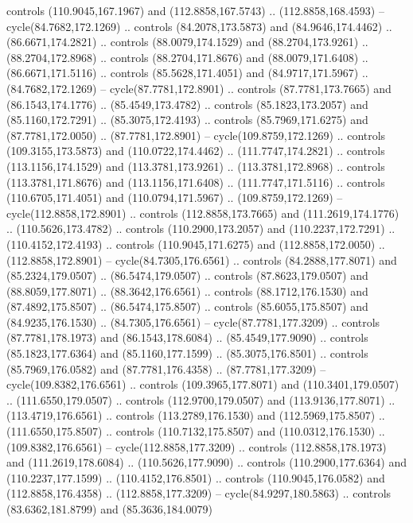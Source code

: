 \begin{scope}[cm={{1.25,0.0,0.0,-1.25,(0.0,442.91375)}}]
    controls (110.9045,167.1967) and (112.8858,167.5743) .. (112.8858,168.4593) --
    cycle(84.7682,172.1269) .. controls (84.2078,173.5873) and (84.9646,174.4462)
    .. (86.6671,174.2821) .. controls (88.0079,174.1529) and (88.2704,173.9261) ..
    (88.2704,172.8968) .. controls (88.2704,171.8676) and (88.0079,171.6408) ..
    (86.6671,171.5116) .. controls (85.5628,171.4051) and (84.9717,171.5967) ..
    (84.7682,172.1269) -- cycle(87.7781,172.8901) .. controls (87.7781,173.7665)
    and (86.1543,174.1776) .. (85.4549,173.4782) .. controls (85.1823,173.2057)
    and (85.1160,172.7291) .. (85.3075,172.4193) .. controls (85.7969,171.6275)
    and (87.7781,172.0050) .. (87.7781,172.8901) -- cycle(109.8759,172.1269) ..
    controls (109.3155,173.5873) and (110.0722,174.4462) .. (111.7747,174.2821) ..
    controls (113.1156,174.1529) and (113.3781,173.9261) .. (113.3781,172.8968) ..
    controls (113.3781,171.8676) and (113.1156,171.6408) .. (111.7747,171.5116) ..
    controls (110.6705,171.4051) and (110.0794,171.5967) .. (109.8759,172.1269) --
    cycle(112.8858,172.8901) .. controls (112.8858,173.7665) and
    (111.2619,174.1776) .. (110.5626,173.4782) .. controls (110.2900,173.2057) and
    (110.2237,172.7291) .. (110.4152,172.4193) .. controls (110.9045,171.6275) and
    (112.8858,172.0050) .. (112.8858,172.8901) -- cycle(84.7305,176.6561) ..
    controls (84.2888,177.8071) and (85.2324,179.0507) .. (86.5474,179.0507) ..
    controls (87.8623,179.0507) and (88.8059,177.8071) .. (88.3642,176.6561) ..
    controls (88.1712,176.1530) and (87.4892,175.8507) .. (86.5474,175.8507) ..
    controls (85.6055,175.8507) and (84.9235,176.1530) .. (84.7305,176.6561) --
    cycle(87.7781,177.3209) .. controls (87.7781,178.1973) and (86.1543,178.6084)
    .. (85.4549,177.9090) .. controls (85.1823,177.6364) and (85.1160,177.1599) ..
    (85.3075,176.8501) .. controls (85.7969,176.0582) and (87.7781,176.4358) ..
    (87.7781,177.3209) -- cycle(109.8382,176.6561) .. controls (109.3965,177.8071)
    and (110.3401,179.0507) .. (111.6550,179.0507) .. controls (112.9700,179.0507)
    and (113.9136,177.8071) .. (113.4719,176.6561) .. controls (113.2789,176.1530)
    and (112.5969,175.8507) .. (111.6550,175.8507) .. controls (110.7132,175.8507)
    and (110.0312,176.1530) .. (109.8382,176.6561) -- cycle(112.8858,177.3209) ..
    controls (112.8858,178.1973) and (111.2619,178.6084) .. (110.5626,177.9090) ..
    controls (110.2900,177.6364) and (110.2237,177.1599) .. (110.4152,176.8501) ..
    controls (110.9045,176.0582) and (112.8858,176.4358) .. (112.8858,177.3209) --
    cycle(84.9297,180.5863) .. controls (83.6362,181.8799) and (85.3636,184.0079)

\end{scope}
